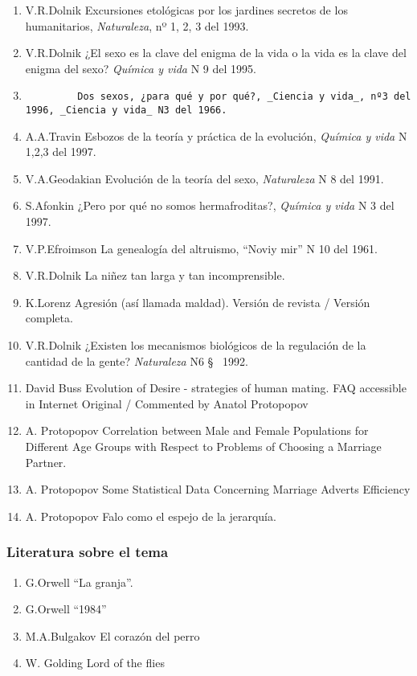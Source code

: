 \begin{enumerate}
\def\labelenumi{\arabic{enumi}.}
\item
  V.R.Dolnik Excursiones etológicas por los jardines secretos de los
  humanitarios, \emph{Naturaleza}, nº 1, 2, 3 del 1993.
\item
  V.R.Dolnik ¿El sexo es la clave del enigma de la vida o la vida es la
  clave del enigma del sexo? \emph{Química y vida} N 9 del 1995.\\
\item
\begin{verbatim}
         Dos sexos, ¿para qué y por qué?, _Ciencia y vida_, nº3 del 1996, _Ciencia y vida_ N3 del 1966.
\end{verbatim}
\item
  A.A.Travin Esbozos de la teoría y práctica de la evolución,
  \emph{Química y vida} N 1,2,3 del 1997.
\item
  V.A.Geodakian Evolución de la teoría del sexo, \emph{Naturaleza} N 8
  del 1991.
\item
  S.Afonkin ¿Pero por qué no somos hermafroditas?, \emph{Química y vida}
  N 3 del 1997.
\item
  V.P.Efroimson La genealogía del altruismo, ``Noviy mir'' N 10 del
  1961.
\item
  V.R.Dolnik La niñez tan larga y tan incomprensible.\\
\item
  K.Lorenz Agresión (así llamada maldad). Versión de revista / Versión
  completa.
\item
  V.R.Dolnik ¿Existen los mecanismos biológicos de la regulación de la
  cantidad de la gente? \emph{Naturaleza} N6 §~ 1992.
\item
  David Buss Evolution of Desire - strategies of human mating. FAQ
  accessible in Internet Original / Commented by Anatol Protopopov
\item
  A. Protopopov Correlation between Male and Female Populations for
  Different Age \textbar{} Groups with Respect to Problems of Choosing a
  Marriage Partner.\\
\item
  A. Protopopov Some Statistical Data Concerning Marriage Adverts
  Efficiency
\item
  A. Protopopov Falo como el espejo de la jerarquía.
\end{enumerate}

\subsubsection{Literatura sobre el tema}\label{literatura-sobre-el-tema}

\begin{enumerate}
\def\labelenumi{\arabic{enumi}.}
\setcounter{enumi}{12}
\tightlist
\item
  G.Orwell ``La granja''.\\
\item
  G.Orwell ``1984''\\
\item
  M.A.Bulgakov El corazón del perro
\item
  W. Golding Lord of the flies
\end{enumerate}
